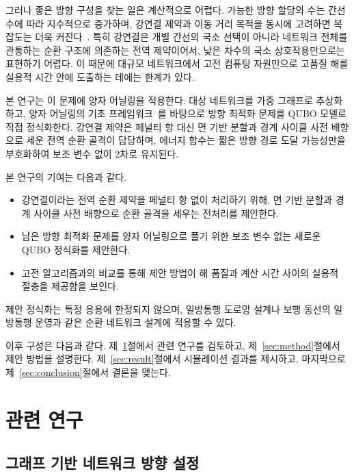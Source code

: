 \documentclass[twocolumn,a4paper]{article}
\begin{document}
그러나 좋은 방향 구성을 찾는 일은 계산적으로 어렵다. 가능한 방향 할당의 수는 간선 수에 따라 지수적으로 증가하며, 강연결 제약과 이동 거리 목적을 동시에 고려하면 복잡도는 더욱 커진다~\cite{burkard1999minimum, bangjensen2023complexity}. 특히 강연결은 개별 간선의 국소 선택이 아니라 네트워크 전체를 관통하는 순환 구조에 의존하는 전역 제약이어서, 낮은 차수의 국소 상호작용만으로는 표현하기 어렵다. 이 때문에 대규모 네트워크에서 고전 컴퓨팅 자원만으로 고품질 해를 실용적 시간 안에 도출하는 데에는 한계가 있다.

본 연구는 이 문제에 양자 어닐링을 적용한다. 대상 네트워크를 가중 그래프로 추상화하고, 양자 어닐링의 기초 프레임워크~\cite{Kadowaki1998}를 바탕으로 방향 최적화 문제를 QUBO 모델로 직접 정식화한다. 강연결 제약은 페널티 항 대신 면 기반 분할과 경계 사이클 사전 배향으로 세운 전역 순환 골격이 담당하며, 에너지 함수는 짧은 방향 경로 도달 가능성만을 부호화하여 보조 변수 없이 2차로 유지된다.

본 연구의 기여는 다음과 같다.
\begin{itemize}
    \setlength{\itemsep}{0pt}
    \setlength{\parsep}{0pt}
    \setlength{\parskip}{0pt}
    \item[(1)] 강연결이라는 전역 순환 제약을 페널티 항 없이 처리하기 위해, 면 기반 분할과 경계 사이클 사전 배향으로 순환 골격을 세우는 전처리를 제안한다.
    \item[(2)] 남은 방향 최적화 문제를 양자 어닐링으로 풀기 위한 보조 변수 없는 새로운 QUBO 정식화를 제안한다.
    \item[(3)] 고전 알고리즘과의 비교를 통해 제안 방법이 해 품질과 계산 시간 사이의 실용적 절충을 제공함을 보인다.
\end{itemize}
제안 정식화는 특정 응용에 한정되지 않으며, 일방통행 도로망 설계나 보행 동선의 일방통행 운영과 같은 순환 네트워크 설계에 적용할 수 있다.

이후 구성은 다음과 같다. 제~\ref{sec:related}절에서 관련 연구를 검토하고, 제~\ref{sec:method}절에서 제안 방법을 설명한다. 제~\ref{sec:result}절에서 시뮬레이션 결과를 제시하고, 마지막으로 제~\ref{sec:conclusion}절에서 결론을 맺는다.

\section{관련 연구} \label{sec:related}

\subsection{그래프 기반 네트워크 방향 설정} \label{subsec:related_graph}
\end{document}

